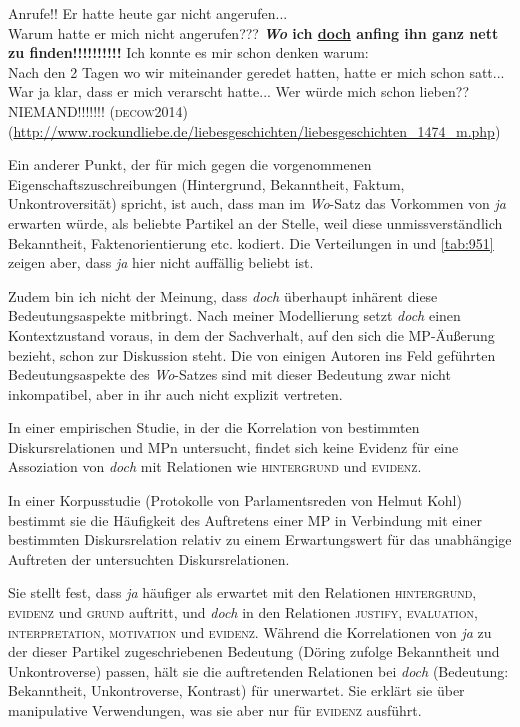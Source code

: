 {\begin{exe}
	Anrufe!! Er hatte heute gar nicht angerufen...\\
	Warum hatte er mich nicht angerufen??? \textbf{\textit{Wo} ich \ul{doch} anfing ihn ganz nett zu finden!!!!!!!!!!} Ich konnte es mir schon 			denken warum:\\
	Nach den 2 Tagen wo wir miteinander geredet hatten, hatte er mich schon satt...\\
	War ja klar, dass er mich verarscht hatte... Wer würde mich schon lieben??\\
	NIEMAND!!!!!!! 			
	\hfill\hbox{\scshape(decow2014)}
	\newline
	{\scriptsize(\url{http://www.rockundliebe.de/liebesgeschichten/liebesgeschichten\_1474\_m.php})}
\end{exe}										  
Ein anderer Punkt, der für mich gegen die vorgenommenen Eigenschaftszuschreibungen (Hintergrund, Bekanntheit, Faktum, Unkontroversität) spricht, ist auch, dass man im \textit{Wo}-Satz das Vorkommen von \textit{ja} erwarten würde, als beliebte Partikel an der Stelle, weil diese unmissverständlich Bekanntheit, Faktenorientierung etc. kodiert. Die Verteilungen in  und \ref{tab:951} zeigen aber, dass \textit{ja} hier nicht auffällig beliebt ist.

Zudem bin ich nicht der Meinung, dass \textit{doch} überhaupt inhärent diese Bedeutungsaspekte mitbringt. Nach meiner Modellierung setzt \textit{doch} einen Kontextzustand voraus, in dem der Sachverhalt, auf den sich die MP-Äußerung bezieht, schon zur Diskussion steht. Die von einigen Autoren ins Feld geführten Bedeutungsaspekte des \textit{Wo}-Satzes sind mit dieser Bedeutung zwar nicht inkompatibel, aber in ihr auch nicht explizit vertreten. 

In einer empirischen Studie, in der \citet{Doering2014} die Korrelation von bestimmten Diskursrelationen und MPn untersucht, findet sich keine Evidenz für eine Assoziation von \textit{doch} mit Relationen wie \textsc{hintergrund} und \textsc{evidenz}. 

In einer Korpusstudie (Protokolle von Parlamentsreden von Helmut Kohl) be\-stimmt sie die Häufigkeit des Auftretens einer MP in Verbindung mit einer bestimmten Diskursrelation relativ zu einem Erwartungswert für das unabhängige Auftreten der untersuchten  Diskursrelationen. 

Sie stellt fest, dass \textit{ja} häufiger als erwartet mit den Relationen \textsc{hintergrund}, \textsc{evidenz} und \textsc{grund} auftritt, und \textit{doch} in den Relationen \textsc{justify}, \textsc{evaluation}, \textsc{interpretation}, \textsc{motivation} und \textsc{evidenz}. Während die Korrelationen von \textit{ja} zu der dieser Partikel zugeschriebenen Bedeutung (Döring zufolge Bekanntheit und Unkontroverse) passen, hält sie die auftretenden Relationen bei \textit{doch} (Bedeutung: Bekanntheit, Unkontroverse, Kontrast) für unerwartet. Sie erklärt sie über manipulative Verwendungen, was sie aber nur für \textsc{evidenz} ausführt. 

}
